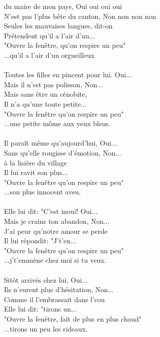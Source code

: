 
 du maire de mon pays, Oui oui oui oui
\\N'est pas l'plus bête du canton, Non non non non
\\Seules les mauvaises langues, dit-on
\\Prétendent qu'il a l'air d'un...
\\"Ouvre la fenêtre, qu'on respire un peu"
\\...qu'il a l'air d'un orgueilleux
\\\\Toutes les filles en pincent pour lui. Oui...
\\Mais il n'est pas polisson. Non...
\\Mais sans être un cénobite,
\\Il n'a qu'une toute petite...
\\"Ouvre la fenêtre qu'on respire un peu"
\\...une petite môme aux yeux bleus.
\\\\Il paraît même qu'aujourd'hui, Oui...
\\Sans qu'elle rougisse d'émotion, Non...
\\à la lisière du village
\\Il lui ravit son plus...
\\"Ouvre la fenêtre qu'on respire un peu"
\\...son plus innocent aveu.
\\\\Elle lui dit: "C'est inouï! Oui...
\\Mais je crains ton abandon, Non...
\\J'ai peur qu'notre amour se perde
\\Il lui répondit: "J't'en...
\\"Ouvre la fenêtre qu'on respire un peu"
\\...j't'emmène chez moi si tu veux.
\\\\Sitôt arrivés chez lui, Oui...
\\Ils n'eurent plus d'hésitation, Non...
\\Comme il l'embrassait dans l'cou
\\Elle lui dit: "tirons un...
\\"Ouvre la fenêtre, fait de plus en plus chaud"
\\...tirons un peu les rideaux.
